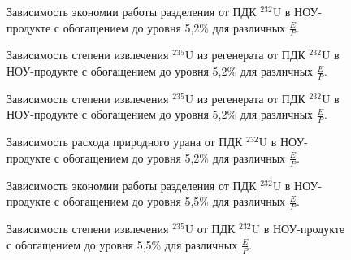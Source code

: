 \begin{figure}
    \centering
    \begin{minipage}{.5\textwidth}
      \centering
      
      \caption{{Зависимость экономии работы разделения от ПДК $^{232}$U в НОУ-продукте с обогащением до уровня 5,2\% для различных $\frac{E}{P}$.{\label{sw44}}}}
    \end{minipage}%
    \begin{minipage}{.5\textwidth}
      \centering
      
      \caption{{Зависимость степени извлечения $^{235}$U из регенерата от ПДК $^{232}$U в НОУ-продукте с обогащением до уровня 5,2\% для различных $\frac{E}{P}$.{\label{exR44}}}}
    \end{minipage}
\end{figure}


\begin{figure}
    \centering
    \begin{minipage}{.5\textwidth}
      \centering
      
\caption{{Зависимость степени извлечения $^{235}$U из регенерата от ПДК $^{232}$U в НОУ-продукте с обогащением до уровня 5,2\% для различных $\frac{E}{P}$.{\label{exR44}}}}
    \end{minipage}%
    \begin{minipage}{.5\textwidth}
      \centering
      
\caption{{Зависимость расхода природного урана от ПДК $^{232}$U в НОУ-продукте с обогащением до уровня 5,2\% для различных $\frac{E}{P}$.{\label{F0R44}}}}
    \end{minipage}
\end{figure}


\begin{figure}
    \centering
    \begin{minipage}{.5\textwidth}
      \centering
      
\caption{{Зависимость экономии работы разделения от ПДК $^{232}$U в НОУ-продукте с обогащением до уровня 5,5\% для различных $\frac{E}{P}$.{\label{sw47}}}}
    \end{minipage}%
    \begin{minipage}{.5\textwidth}
      \centering
      
\caption{{Зависимость степени извлечения $^{235}$U от ПДК $^{232}$U в НОУ-продукте с обогащением до уровня 5,5\% для различных $\frac{E}{P}$.{\label{ex47}}}}
\end{minipage}
\end{figure}

